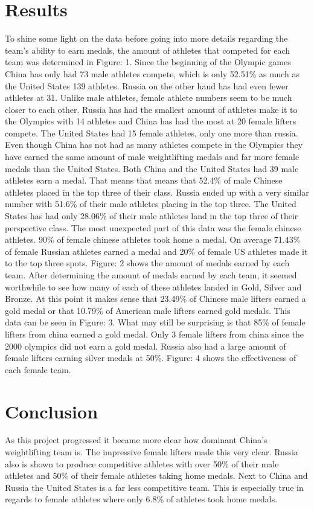 \documentclass{article}
\begin{document}
\section{Results}
	To shine some light on the data before going into more details regarding the team's ability to earn medals, the amount of athletes that competed for each team was determined in Figure: 1. Since the beginning of the Olympic games China has only had 73 male athletes compete, which is only 52.51\% as much as the United States 139 athletes. Russia on the other hand has had even fewer athletes at 31. Unlike male athletes, female athlete numbers seem to be much closer to each other. Russia has had the smallest amount of athletes make it to the Olympics with 14 athletes and China has had the most at 20 female lifters compete. The United States had 15 female athletes, only one more than russia. 
\bigbreak
	Even though China has not had as many athletes compete in the Olympics they have earned the same amount of male weightlifting medals and far more female medals than the United States. Both China and the United States had 39 male athletes earn a medal. That means that means that 52.4\% of male Chinese athletes placed in the top three of their class. Russia ended up with a very similar number with 51.6\% of their male athletes placing in the top three. The United States has had only 28.06\% of their male athletes land in the top three of their perspective class. The most unexpected part of this data was the female chinese athletes. 90\% of female chinese athletes took home a medal. On average 71.43\% of female Russian athletes earned a medal and 20\% of female US athletes made it to the top three spots. Figure: 2 shows the amount of medals earned by each team.
\bigbreak
	After determining the amount of medals earned by each team, it seemed worthwhile to see how many of each of these athletes landed in Gold, Silver and Bronze. At this point it makes sense that 23.49\% of Chinese male lifters earned a gold medal or that 10.79\% of American male lifters earned gold medals. This data can be seen in Figure: 3. What may still be surprising is that 85\% of female lifters from china earned a gold medal.  Only 3 female lifters from china since the 2000 olympics did not earn a gold medal. Russia also had a large amount of female lifters earning silver medals at 50\%. Figure: 4 shows the effectiveness of each female team.

\section{Conclusion}
	As this project progressed it became more clear how dominant China's weightlifting team is. The impressive female lifters made this very clear. Russia also is shown to produce competitive athletes with over 50\% of their male athletes and 50\% of their female athletes taking home medals. Next to China and Russia the United States is a far less competitive team. This is especially true in regards to female athletes where only 6.8\% of athletes took home medals.
\end{document}
